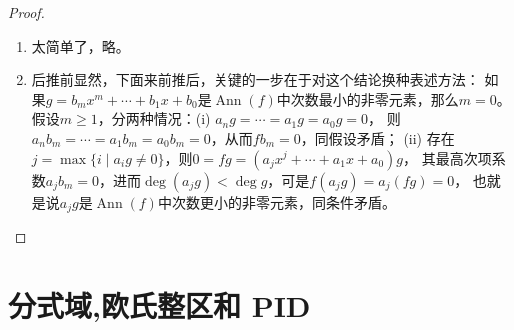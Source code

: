 \begin{enumerate}
\begin{proof}
\begin{enumerate}[label=(\arabic*)]
    接下来，$f-a_nx^n$是可逆元减幂零元从而亦可逆，
    对其重复上面的操作可得最高次项系数$a_{n-1}$幂零，以此类推，最终得到$a_1$幂零和$a_0$可逆。
    \item 太简单了，略。
    \item 后推前显然，下面来前推后，关键的一步在于对这个结论换种表述方法：
    如果$g=b_mx^m+\cdots+b_1x+b_0$是$\operatorname{Ann}(f)$中次数最小的非零元素，那么$m=0$。
    假设$m\geqslant1$，分两种情况：(i) $a_ng=\cdots=a_1g=a_0g=0$，
    则$a_nb_m=\cdots=a_1b_m=a_0b_m=0$，从而$fb_m=0$，同假设矛盾；
    (ii) 存在$j=\max\{i \mid a_ig\ne0\}$，则$0=fg=(a_jx^j+\cdots+a_1x+a_0)g$，
    其最高次项系数$a_jb_m=0$，进而$\deg(a_jg)<\deg g$，可是$f(a_jg)=a_j(fg)=0$，
    也就是说$a_jg$是$\operatorname{Ann}(f)$中次数更小的非零元素，同条件矛盾。\qedhere
    \end{enumerate}
\end{proof}

\end{enumerate}

\section{分式域,欧氏整区和 PID}

